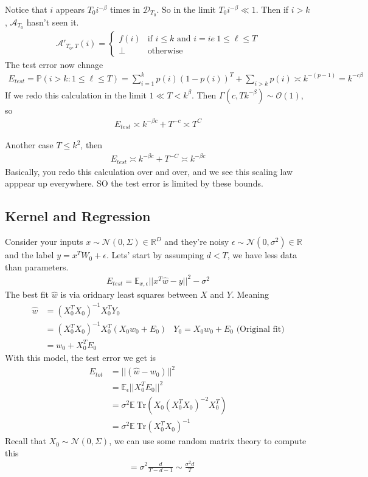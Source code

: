Notice that $i$ appears $T_0 i^{-\beta}$ times in $\mathcal D_{T_0}$. So in the limit $T_0 i^{-\beta} \ll 1$. Then if $i > k$, $\mathcal A_{T_0}$ hasn't seen it.
\begin{align}
	\mathcal A'_{T_0, T}(i) = \begin{cases}
		f(i) & \text{if } i \leq k \text{ and } i=ie ~ 1 \leq \ell \leq T\\
		\perp & \text{otherwise}
	\end{cases}
\end{align}
The test error now chnage 
\begin{align}
	E_{test} = \mathbb P (i > k : 1 \leq \ell \leq T) = \sum_{i=1}^k p(i) (1-p(i))^T + \sum_{i > k}p(i) \asymp k^{-(p-1)}= k^{-c\beta}
\end{align}
If we redo this calculation in the limit $1 \ll T < k^\beta$. Then $\Gamma(c, Tk^{-\beta}) \sim \mathcal O(1)$, so 
\begin{align}
	E_{test} \asymp k^{-\beta c} + T^{-c} \asymp T^C
\end{align}

Another case $T \leq k^2$, then
\begin{align}
	E_{test} \asymp k^{-\beta c} + T^{-C} \asymp k^{-\beta c}
\end{align}
Basically, you redo this calculation over and over, and we see this scaling law apppear up everywhere. SO the test error is limited by these bounds.

\subsection{Kernel and Regression}
Consider your inputs $x \sim \mathcal N(0, \Sigma) \in \mathbb R^D$ and they're noisy $\epsilon \sim \mathcal N(0, \sigma^2) \in \mathbb R$ and the label $y = x^T W_0 + \epsilon$. Lets' start by assumping $d < T$, we have less data than parameters.
\begin{align}
	E_{test} = \mathbb E_{x, \epsilon} || x^T \hat w - y ||^2 - \sigma^2
\end{align}
The best fit $\hat w$ is via oridnary least squares between $X$ and $Y$. Meaning
\begin{align}
	\hat w & = (X_0^T  X_0)^{-1} X_0^T Y_0\\
	&  = (X_0^T X_0)^{-1} X_0^T (X_0 w_0 + E_0) & Y_0 = X_0 w_0 + E_0 \text{ (Original fit)}\\
	& = w_0 + X_0^T E_0
\end{align}
With this model, the test error we get is
\begin{align}
	E_{tot} & = ||(\hat w - w_0)||^2 \\
	& = \mathbb E_\epsilon || X_0^T E_0 ||^2\\
	& = \sigma^2 \mathbb E ~\text{Tr}(X_0(X_0^T X_0)^{-2} X_0^T )\\
	& = \sigma^2 \mathbb E ~ \text{Tr}(X_0^T X_0)^{-1}
\end{align}
Recall that $X_0 \sim \mathcal N(0, \Sigma)$, we can use some random matrix theory to compute this
\begin{align}
	& =  \sigma^2 \frac{d}{T-d-1} \sim \frac{\sigma^2 d}{T}
\end{align}
